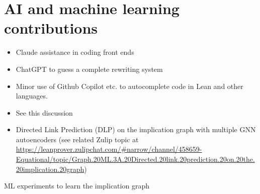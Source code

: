 \section{AI and machine learning contributions}


\begin{itemize}
\item Claude assistance in coding front ends
\item ChatGPT to guess a complete rewriting system
\item Minor use of Github Copilot etc. to autocomplete code in Lean and other languages.
\item See this discussion
\item Directed Link Prediction (DLP) on the implication graph with multiple GNN autoencoders
  (see related Zulip topic at \url{https://leanprover.zulipchat.com/#narrow/channel/458659-Equational/topic/Graph.20ML.3A.20Directed.20link.20prediction.20on.20the.20implication.20graph})
\end{itemize}

ML experiments to learn the implication graph
